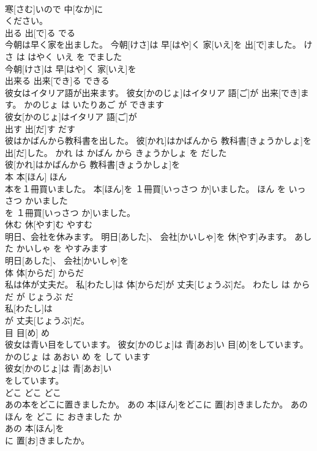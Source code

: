\documentclass[8pt]{extreport}
\begin{document}
\begin{CJK}{UTF8}{min}
\\	寒[さむ]いので 中[なか]に
\\	ください。			
\\	出る	出[で]る	でる	
\\	今朝は早く家を出ました。	今朝[けさ]は 早[はや]く 家[いえ]を 出[で]ました。	けさ は はやく いえ を でました	
\\	今朝[けさ]は 早[はや]く 家[いえ]を
\\	出来る	出来[でき]る	できる	
\\	彼女はイタリア語が出来ます。	彼女[かのじょ]はイタリア 語[ご]が 出来[でき]ます。	かのじょ は いたりあご が できます	
\\	彼女[かのじょ]はイタリア 語[ご]が
\\	出す	出[だ]す	だす	
\\	彼はかばんから教科書を出した。	彼[かれ]はかばんから 教科書[きょうかしょ]を 出[だ]した。	かれ は かばん から きょうかしょ を だした	
\\	彼[かれ]はかばんから 教科書[きょうかしょ]を
\\	本	本[ほん]	ほん	
\\	本を１冊買いました。	本[ほん]を １冊買[いっさつ か]いました。	ほん を いっさつ かいました	
\\	を １冊買[いっさつ か]いました。			
\\	休む	休[やす]む	やすむ	
\\	明日、会社を休みます。	明日[あした]、 会社[かいしゃ]を 休[やす]みます。	あした かいしゃ を やすみます	
\\	明日[あした]、 会社[かいしゃ]を
\\	体	体[からだ]	からだ	
\\	私は体が丈夫だ。	私[わたし]は 体[からだ]が 丈夫[じょうぶ]だ。	わたし は からだ が じょうぶ だ	
\\	私[わたし]は
\\	が 丈夫[じょうぶ]だ。			
\\	目	目[め]	め	
\\	彼女は青い目をしています。	彼女[かのじょ]は 青[あお]い 目[め]をしています。	かのじょ は あおい め を して います	
\\	彼女[かのじょ]は 青[あお]い
\\	をしています。			
\\	どこ	どこ	どこ	
\\	あの本をどこに置きましたか。	あの 本[ほん]をどこに 置[お]きましたか。	あの ほん を どこ に おきました か	
\\	あの 本[ほん]を
\\	に 置[お]きましたか。			

\end{CJK}
\end{document}
